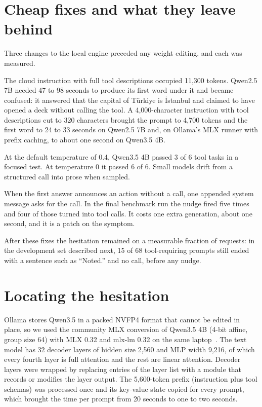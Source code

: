 \documentclass[11pt]{article}
\begin{document}
\section{Cheap fixes and what they leave behind}
\label{sec:fixes}

Three changes to the local engine preceded any weight editing, and each was measured.

The cloud instruction with full tool descriptions occupied 11,300 tokens. Qwen2.5 7B needed 47 to 98 seconds to produce its first word under it and became confused: it answered that the capital of Türkiye is İstanbul and claimed to have opened a deck without calling the tool. A 4,000-character instruction with tool descriptions cut to 320 characters brought the prompt to 4,700 tokens and the first word to 24 to 33 seconds on Qwen2.5 7B and, on Ollama's MLX runner with prefix caching, to about one second on Qwen3.5 4B.

At the default temperature of 0.4, Qwen3.5 4B passed 3 of 6 tool tasks in a focused test. At temperature 0 it passed 6 of 6. Small models drift from a structured call into prose when sampled.

When the first answer announces an action without a call, one appended system message asks for the call. In the final benchmark run the nudge fired five times and four of those turned into tool calls. It costs one extra generation, about one second, and it is a patch on the symptom.

After these fixes the hesitation remained on a measurable fraction of requests: in the development set described next, 15 of 68 tool-requiring prompts still ended with a sentence such as ``Noted.'' and no call, before any nudge.

\section{Locating the hesitation}
\label{sec:edit}

Ollama stores Qwen3.5 in a packed NVFP4 format that cannot be edited in place, so we used the community MLX conversion of Qwen3.5 4B (4-bit affine, group size 64) with MLX 0.32 and mlx-lm 0.32 on the same laptop~\citep{mlx2023}. The text model has 32 decoder layers of hidden size 2,560 and MLP width 9,216, of which every fourth layer is full attention and the rest are linear attention. Decoder layers were wrapped by replacing entries of the layer list with a module that records or modifies the layer output. The 5,600-token prefix (instruction plus tool schemas) was processed once and its key-value state copied for every prompt, which brought the time per prompt from 20 seconds to one to two seconds.
\end{document}
